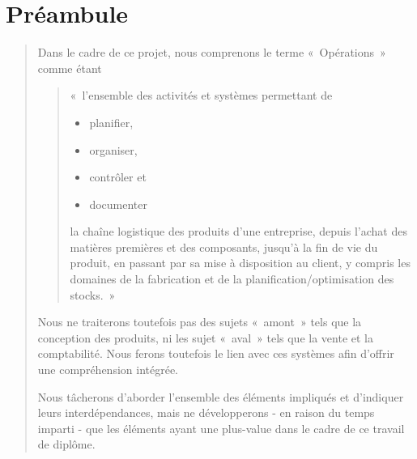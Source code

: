 \documentclass[letterpaper,10pt,french]{sphinxmanual}
\begin{document}
\section{Préambule}
\label{\detokenize{readthedocs/operations:preambule}}\begin{quote}

Dans le cadre de ce projet, nous comprenons le terme « Opérations » comme étant
\begin{quote}

« l’ensemble des activités et systèmes permettant de
\begin{itemize}
\item {} 
planifier,

\item {} 
organiser,

\item {} 
contrôler et

\item {} 
documenter

\end{itemize}

la chaîne logistique des produits d’une entreprise, depuis l’achat des matières premières et des composants, jusqu’à la fin de vie du produit, en passant par sa mise à disposition au client, y compris les domaines de la fabrication et de la planification/optimisation des stocks. »
\end{quote}

Nous ne traiterons toutefois pas des sujets « amont » tels que la conception des produits, ni les sujet « aval » tels que la vente et la comptabilité. Nous ferons toutefois le lien avec ces systèmes afin d’offrir une compréhension intégrée.

Nous tâcherons d’aborder l’ensemble des éléments impliqués et d’indiquer leurs interdépendances, mais ne développerons - en raison du temps imparti - que les éléments ayant une plus-value dans le cadre de ce travail de diplôme.
\end{quote}
\end{document}
